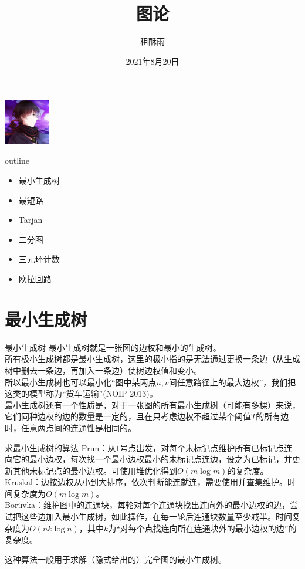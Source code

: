 \documentclass{beamer}
\title{图论}
\date{2021年8月20日}
\author{租酥雨}
\begin{document}
\small
	
	\begin{frame}
	\titlepage
		\begin{center}
		\includegraphics[width=2.0cm]{zsy.jpg}
		\end{center}
	\end{frame}

\begin{frame}{outline}
	\begin{itemize}
		\item 最小生成树
		\item 最短路
		\item Tarjan
		\item 二分图
		\item 三元环计数
		\item 欧拉回路
	\end{itemize}
\end{frame}
\section{最小生成树}
\begin{frame}{最小生成树}
	最小生成树就是一张图的边权和最小的生成树。\\
	
	所有极小生成树都是最小生成树，这里的极小指的是无法通过更换一条边（从生成树中删去一条边，再加入一条边）使树边权值和变小。\\
	
	所以最小生成树也可以最小化“图中某两点$u, v$间任意路径上的最大边权”，我们把这类的模型称为“货车运输”(NOIP 2013)。\\
	
	最小生成树还有一个性质是，对于一张图的所有最小生成树（可能有多棵）来说，它们同种边权的边的数量是一定的，且在只考虑边权不超过某个阈值$T$的所有边时，任意两点间的连通性是相同的。
\end{frame}
\begin{frame}{求最小生成树的算法}
	Prim：从$1$号点出发，对每个未标记点维护所有已标记点连向它的最小边权，每次找一个最小边权最小的未标记点连边，设之为已标记，并更新其他未标记点的最小边权。可使用堆优化得到$O(m\log m)$的复杂度。\\
	
	Kruskal：边按边权从小到大排序，依次判断能连就连，需要使用并查集维护。时间复杂度为$O(m\log m)$。\\
	
	Borüvka：维护图中的连通块，每轮对每个连通块找出连向外的最小边权的边，尝试把这些边加入最小生成树，如此操作，在每一轮后连通块数量至少减半。时间复杂度为$O(nk\log n)$，其中$k$为“对每个点找连向所在连通块外的最小边权的边”的复杂度。
	
	这种算法一般用于求解（隐式给出的）完全图的最小生成树。
\end{frame}
\end{document}
